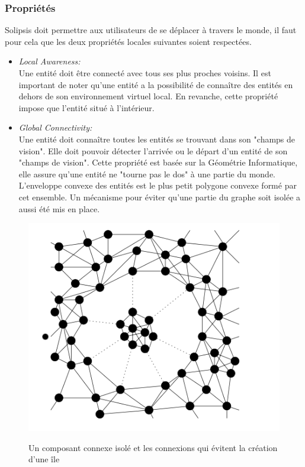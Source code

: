 		\subsubsection{Propriétés}
	Solipsis doit permettre aux utilisateurs de se déplacer à travers le monde, il faut pour cela que les deux propriétés locales suivantes soient respectées.
	\begin{itemize}
	\renewcommand{\labelitemi}{$\bullet$}
		\item \textit{Local Awareness:}\\
		Une entité doit être connecté avec tous ses plus proches voisins. Il est important de noter qu'une entité a la possibilité de connaître des entités en dehors de son environnement virtuel local. En revanche, cette propriété impose que l'entité situé à l'intérieur.	
		\item \textit{Global Connectivity:}\\
		Une entité doit connaître toutes les entités se trouvant dans son "champs de vision". Elle doit pouvoir détecter l'arrivée ou le départ d'un entité de son "champs de vision". Cette propriété est basée sur la Géométrie Informatique, elle assure qu'une entité ne "tourne pas le dos" à une partie du monde. L'enveloppe convexe des entités est le plus petit polygone convexe formé par cet ensemble. Un mécanisme pour éviter qu'une partie du graphe soit isolée a aussi été mis en place.\\
	\end{itemize}
        \vspace{1cm}
	\begin{figure}[!h]
	\centering
        \includegraphics[scale=0.9]{../Images/composant_isole1.png}\\
        \caption{Un composant connexe isolé et les connexions qui évitent la création d'une île}
        \label{Envelop_Convex}
        \end{figure}

